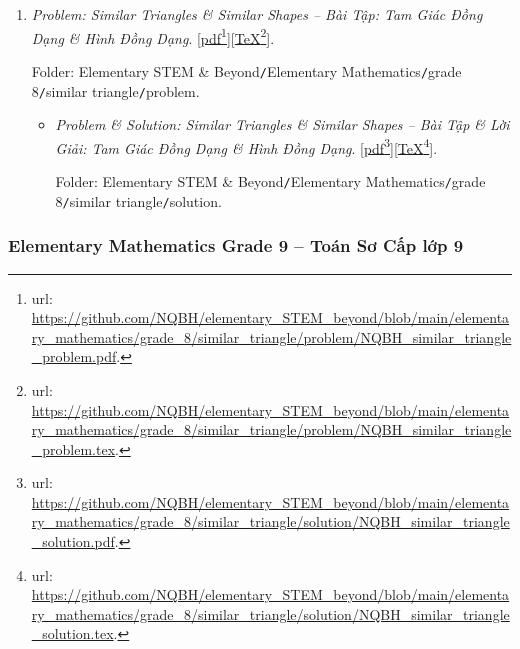 \documentclass[12pt,oneside]{book}
\begin{document}
\begin{enumerate}
\begin{itemize}
		Folder: {\sf Elementary STEM \& Beyond{\tt/}Elementary Mathematics{\tt/}grade 8{\tt/}1st-order polynomial equation 1 variable{\tt/}solution}.
	\end{itemize}
	\item {\it Problem: Similar Triangles \& Similar Shapes -- Bài Tập: Tam Giác Đồng Dạng \& Hình Đồng Dạng}. [\href{https://github.com/NQBH/elementary_STEM_beyond/blob/main/elementary_mathematics/grade_8/similar_triangle/problem/NQBH_similar_triangle_problem.pdf}{pdf}\footnote{{\sc url}: \url{https://github.com/NQBH/elementary_STEM_beyond/blob/main/elementary_mathematics/grade_8/similar_triangle/problem/NQBH_similar_triangle_problem.pdf}.}][\href{https://github.com/NQBH/elementary_STEM_beyond/blob/main/elementary_mathematics/grade_8/similar_triangle/problem/NQBH_similar_triangle_problem.tex}{\TeX}\footnote{{\sc url}: \url{https://github.com/NQBH/elementary_STEM_beyond/blob/main/elementary_mathematics/grade_8/similar_triangle/problem/NQBH_similar_triangle_problem.tex}.}].
	
	Folder: {\sf Elementary STEM \& Beyond{\tt/}Elementary Mathematics{\tt/}grade 8{\tt/}similar triangle{\tt/}problem}.
	\begin{itemize}
		\item {\it Problem \& Solution: Similar Triangles \& Similar Shapes -- Bài Tập \& Lời Giải: Tam Giác Đồng Dạng \& Hình Đồng Dạng}. [\href{https://github.com/NQBH/elementary_STEM_beyond/blob/main/elementary_mathematics/grade_8/similar_triangle/solution/NQBH_similar_triangle_solution.pdf}{pdf}\footnote{{\sc url}: \url{https://github.com/NQBH/elementary_STEM_beyond/blob/main/elementary_mathematics/grade_8/similar_triangle/solution/NQBH_similar_triangle_solution.pdf}.}][\href{https://github.com/NQBH/elementary_STEM_beyond/blob/main/elementary_mathematics/grade_8/similar_triangle/solution/NQBH_similar_triangle_solution.tex}{\TeX}\footnote{{\sc url}: \url{https://github.com/NQBH/elementary_STEM_beyond/blob/main/elementary_mathematics/grade_8/similar_triangle/solution/NQBH_similar_triangle_solution.tex}.}].
		
		Folder: {\sf Elementary STEM \& Beyond{\tt/}Elementary Mathematics{\tt/}grade 8{\tt/}similar triangle{\tt/}solution}.
	\end{itemize}
\end{enumerate}

\subsubsection{Elementary Mathematics Grade 9 -- Toán Sơ Cấp lớp 9}
\end{document}
